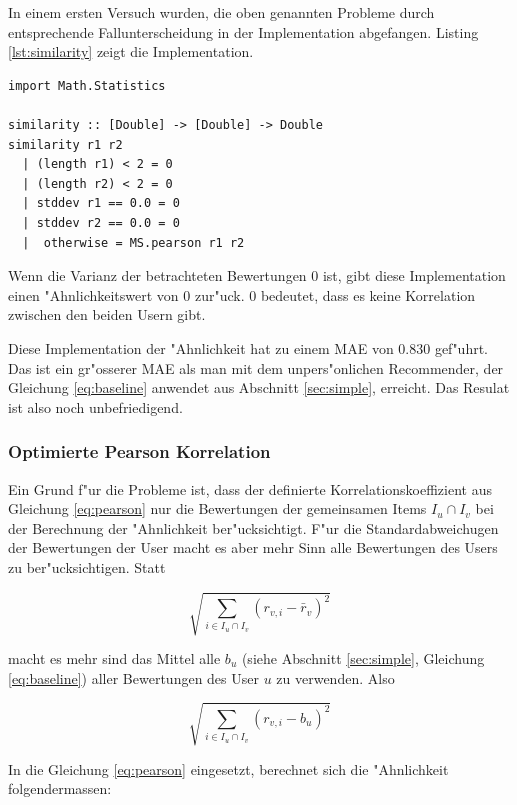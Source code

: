 \documentclass[a4paper, 12pt]{article}
\begin{document}
In einem ersten Versuch wurden, die oben genannten Probleme durch entsprechende Fallunterscheidung in der Implementation abgefangen. Listing \ref{lst:similarity} zeigt die Implementation.

\begin{lstlisting}[caption=Similarity, label=lst:similarity]
import Math.Statistics

similarity :: [Double] -> [Double] -> Double
similarity r1 r2
  | (length r1) < 2 = 0
  | (length r2) < 2 = 0
  | stddev r1 == 0.0 = 0
  | stddev r2 == 0.0 = 0
  |  otherwise = MS.pearson r1 r2

\end{lstlisting}

Wenn die Varianz der betrachteten Bewertungen 0 ist, gibt diese Implementation einen "Ahnlichkeitswert von 0 zur"uck. 0 bedeutet, dass es keine Korrelation zwischen den beiden Usern gibt.

Diese Implementation der "Ahnlichkeit hat zu einem MAE von 0.830 gef"uhrt. Das ist ein gr"osserer MAE als man mit dem unpers"onlichen Recommender, der Gleichung \ref{eq:baseline} anwendet aus Abschnitt \ref{sec:simple}, erreicht. Das Resulat ist also noch unbefriedigend.


\subsubsection{Optimierte Pearson Korrelation}
\label{sec:optpearson}

Ein Grund f"ur die Probleme ist, dass der definierte Korrelationskoeffizient aus Gleichung \ref{eq:pearson} nur die Bewertungen der gemeinsamen Items  $I_u \cap I_v$ bei der Berechnung der "Ahnlichkeit ber"ucksichtigt. F"ur die Standardabweichugen der Bewertungen der User macht es aber mehr Sinn alle Bewertungen des Users zu ber"ucksichtigen. Statt 

\begin{equation}
  \label{eq:naiv}
  \sqrt{\sum_{i \in I_u \cap I_v}( r_{v,i} - \bar{r}_v)^2}
\end{equation}

macht es mehr sind das Mittel alle $b_u$ (siehe Abschnitt \ref{sec:simple}, Gleichung \ref{eq:baseline}) aller Bewertungen des User $u$ zu verwenden. Also

\begin{equation}
  \label{eq:naiv}
  \sqrt{\sum_{i \in I_u \cap I_v}( r_{v,i} - b_u)^2}
\end{equation}

In die Gleichung \ref{eq:pearson} eingesetzt, berechnet sich die "Ahnlichkeit folgendermassen:
\end{document}
